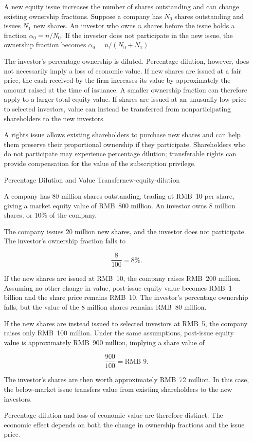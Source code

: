 A new equity issue increases the number of shares outstanding and can change existing ownership fractions. Suppose a company has \(N_0\) shares outstanding and issues \(N_1\) new shares. An investor who owns \(n\) shares before the issue holds a fraction $\alpha_0=n/N_0$. If the investor does not participate in the new issue, the ownership fraction becomes $\alpha_0=n/(N_0+N_1)$  

The investor's percentage ownership is diluted. Percentage dilution, however, does not necessarily imply a loss of economic value. If new shares are issued at a fair price, the cash received by the firm increases its value by approximately the amount raised at the time of issuance. A smaller ownership fraction can therefore apply to a larger total equity value. If shares are issued at an unusually low price to selected investors, value can instead be transferred from nonparticipating shareholders to the new investors.

A rights issue allows existing shareholders to purchase new shares and can help them preserve their proportional ownership if they participate. Shareholders who do not participate may experience percentage dilution; transferable rights can provide compensation for the value of the subscription privilege.

\begin{example}{Percentage Dilution and Value Transfer}{new-equity-dilution}

A company has 80 million shares outstanding, trading at RMB~10 per share, giving a market equity value of RMB~800 million. An investor owns 8 million shares, or 10\% of the company.

The company issues 20 million new shares, and the investor does not participate. The investor's ownership fraction falls to

\[
\frac{8}{100}=8\%.
\]

If the new shares are issued at RMB~10, the company raises RMB~200 million. Assuming no other change in value, post-issue equity value becomes RMB~1 billion and the share price remains RMB~10. The investor's percentage ownership falls, but the value of the 8 million shares remains RMB~80 million.

If the new shares are instead issued to selected investors at RMB~5, the company raises only RMB~100 million. Under the same assumptions, post-issue equity value is approximately RMB~900 million, implying a share value of

\[
\frac{900}{100}=\text{RMB }9.
\]

The investor's shares are then worth approximately RMB~72 million. In this case, the below-market issue transfers value from existing shareholders to the new investors.

Percentage dilution and loss of economic value are therefore distinct. The economic effect depends on both the change in ownership fractions and the issue price.

\end{example}


